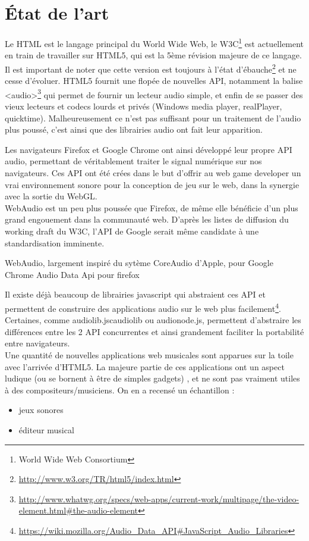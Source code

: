 \documentclass[pdftex,12pt,a4paper]{article}
\begin{document}
\section{État de l'art}

Le HTML est le langage principal du World Wide Web, le W3C\footnote{World Wide Web Consortium} est actuellement en train de travailler sur HTML5, qui est la 5ème révision majeure de ce langage. Il est important de noter que cette version est toujours à l'état d'ébauche\footnote{\url{http://www.w3.org/TR/html5/index.html}} et ne cesse d'évoluer.
HTML5 fournit une flopée de nouvelles API, notamment la balise <audio>\footnote{\url{http://www.whatwg.org/specs/web-apps/current-work/multipage/the-video-element.html#the-audio-element}} qui permet de fournir un lecteur audio simple, et enfin de se passer des vieux lecteurs et codecs lourds et privés (Windows media player, realPlayer, quicktime).
Malheureusement ce n'est pas suffisant pour un traitement de l'audio plus poussé, c'est ainsi que des librairies audio ont fait leur apparition.

\medskip
Les navigateurs Firefox et Google Chrome ont ainsi développé leur propre API audio, permettant de véritablement traiter le signal numérique sur nos navigateurs.
Ces API ont été crées dans le but d'offrir au web game developer un vrai environnement sonore pour la conception de jeu sur le web, dans la synergie avec la sortie du WebGL.\\
WebAudio est un peu plus poussée que Firefox, de même elle bénéficie d'un plus grand engouement dans la communauté web. D'après les listes de diffusion du working draft du W3C, l'API de Google serait même candidate à une standardisation imminente.

WebAudio, largement inspiré du sytème CoreAudio d'Apple, pour Google Chrome
Audio Data Api pour firefox

\medskip
Il existe déjà beaucoup de librairies javascript qui abstraient ces API et permettent de construire des applications audio sur le web plus facilement\footnote{\url{https://wiki.mozilla.org/Audio_Data_API#JavaScript_Audio_Libraries}}.
Certaines, comme audiolib.jsc{audiolib} ou audionode.js, permettent d'abstraire les différences entre les 2 API concurrentes et ainsi grandement faciliter la portabilité entre navigateurs.\\
Une quantité de nouvelles applications web musicales sont apparues sur la toile avec l'arrivée d'HTML5. La majeure partie de ces applications ont un aspect ludique (ou se bornent à être de simples gadgets) , et ne sont pas vraiment utiles à des compositeurs/musiciens. On en a recensé un échantillon : 
\begin{itemize}
\item jeux sonores
\item éditeur musical
\end{itemize}
\end{document}
